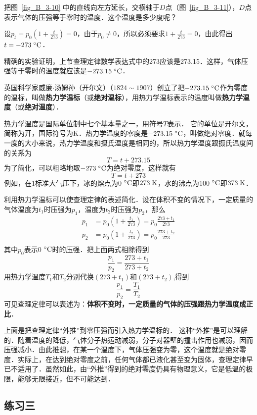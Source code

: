 把图~\ref{fig_B_3-10} 中的直线向左方延长，交横轴于$D$点（图~\ref{fig_B_3-11}），$D$点表示气体的压强等于零时的温度．这个温度是多少度呢？

设$p_t=p_0 \left(1+\frac{t}{273}\right)=0$，由于$p_0\ne 0$，所以必须要求$1+\frac{t}{273}=0$，由此得出$t=-273 \;{}^\circ\text{C} $．

精确的实验证明，上节查理定律数学表达式中的273应该是273.15．这样，气体压强等于零时的温度就应该是$-273.15 \;{}^\circ\text{C} $．



英国科学家威廉$\cdot$汤姆孙（开尔文）（$1824 \sim 1907$）创立了把$-273.15 \;{}^\circ\text{C}$作为零度的温标，叫做\textbf{热力学温标}（或\textbf{绝对温标}），用热力学温标表示的温度叫做\textbf{热力学温度}（或\textbf{绝对温度}）．

热力学温度是国际单位制中七个基本量之一，用符号$T$表示．
它的单位是开尔文，简称为开，国际符号为K．热力学温度的零度是$-273.15 \;{}^\circ\text{C}$，叫做绝对零度．就每一度的大小来说，热力学温度和摄氏温度是相同的，所以热力学温度跟摄氏温度间的关系为
\[T=t+273.15 \]
为了简化，可以粗略地取$-273 \;{}^\circ\text{C} $为绝对零度，这样就有
\[T=t+273 \]
例如，在1标准大气压下，冰的熔点为0$\;{}^\circ\text{C}$即$273 \;\text{K} $，水的沸点为100$\;{}^\circ\text{C}$即$373 \;\text{K}$．

利用热力学温标可以使查理定律的表述简化．设在体积不变的情况下，一定质量的气体温度为$t_1$时压强为$p_1$，温度为$t_2$时压强为$p_2$，那么
\[\begin{split}
p_1&=p_0\left(1+\frac{t_1}{273}\right)=p_0\frac{273+t_1}{273}\\
p_2&=p_0\left(1+\frac{t_2}{273}\right)=p_0\frac{273+t_2}{273}\\
\end{split} \]
其中$p_0$表示0$\;{}^\circ\text{C}$时的压强．把上面两式相除得到
\[\frac{p_1}{p_2}=\frac{273+t_1}{273+t_2} \]
用热力学温度$T_1$和$T_2$分别代换$(273+t_1)$和$(273+t_2)$,得到
\[\frac{p_1}{p_2}=\frac{T_1}{T_2} \]
可见查理定律可以表述为：\textbf{体积不变时，一定质量的气体的压强跟热力学温度成正比}．

上面是把查理定律“外推”到零压强而引入热力学温标的．
这种“外推”是可以理解的．随着温度的降低，气体分子热运动减弱，分子对器壁的撞击作用也减弱，因而压强减小．由此推想，在某一个温度下，气体压强变为零，这个温度就是绝对零度．实际上，在达到绝对零度之前，任何气体都已液化甚至变为固体，查理定律早已不适用了．虽然如此，由“外推”得到的绝对零度仍具有物理意义，它是低温的极限，能够无限接近，但不可能达到．

\subsection*{练习三}

